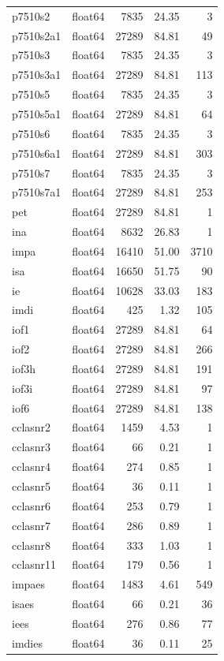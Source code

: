 \begin{longtable}{llrrr}
p7510s2 & float64 & 7835 & 24.35 & 3 \\
p7510s2a1 & float64 & 27289 & 84.81 & 49 \\
p7510s3 & float64 & 7835 & 24.35 & 3 \\
p7510s3a1 & float64 & 27289 & 84.81 & 113 \\
p7510s5 & float64 & 7835 & 24.35 & 3 \\
p7510s5a1 & float64 & 27289 & 84.81 & 64 \\
p7510s6 & float64 & 7835 & 24.35 & 3 \\
p7510s6a1 & float64 & 27289 & 84.81 & 303 \\
p7510s7 & float64 & 7835 & 24.35 & 3 \\
p7510s7a1 & float64 & 27289 & 84.81 & 253 \\
pet & float64 & 27289 & 84.81 & 1 \\
ina & float64 & 8632 & 26.83 & 1 \\
impa & float64 & 16410 & 51.00 & 3710 \\
isa & float64 & 16650 & 51.75 & 90 \\
ie & float64 & 10628 & 33.03 & 183 \\
imdi & float64 & 425 & 1.32 & 105 \\
iof1 & float64 & 27289 & 84.81 & 64 \\
iof2 & float64 & 27289 & 84.81 & 266 \\
iof3h & float64 & 27289 & 84.81 & 191 \\
iof3i & float64 & 27289 & 84.81 & 97 \\
iof6 & float64 & 27289 & 84.81 & 138 \\
cclasnr2 & float64 & 1459 & 4.53 & 1 \\
cclasnr3 & float64 & 66 & 0.21 & 1 \\
cclasnr4 & float64 & 274 & 0.85 & 1 \\
cclasnr5 & float64 & 36 & 0.11 & 1 \\
cclasnr6 & float64 & 253 & 0.79 & 1 \\
cclasnr7 & float64 & 286 & 0.89 & 1 \\
cclasnr8 & float64 & 333 & 1.03 & 1 \\
cclasnr11 & float64 & 179 & 0.56 & 1 \\
impaes & float64 & 1483 & 4.61 & 549 \\
isaes & float64 & 66 & 0.21 & 36 \\
iees & float64 & 276 & 0.86 & 77 \\
imdies & float64 & 36 & 0.11 & 25 \\

\end{longtable}
